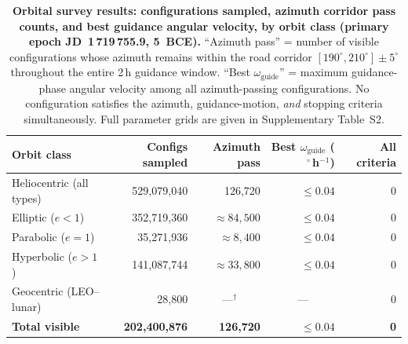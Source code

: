 \documentclass[sn-nature]{sn-jnl}
\begin{document}
\clearpage
\setcounter{table}{0}
\renewcommand{\thetable}{\textbf{Extended Data Table~\arabic{table}}}
\setcounter{figure}{0}
\renewcommand{\thefigure}{\textbf{Extended Data Fig.~\arabic{figure}}}

\begin{table}[h]
\caption{\textbf{Orbital survey results: configurations sampled, azimuth
  corridor pass counts, and best guidance angular velocity, by orbit class
  (primary epoch JD~1\,719\,755.9, 5~BCE).}
  ``Azimuth pass'' = number of visible configurations whose azimuth
  remains within the road corridor $[190^\circ,\!210^\circ]\pm5^\circ$
  throughout the entire 2\,h guidance window.
  ``Best $\omega_\text{guide}$'' = maximum guidance-phase angular velocity
  among all azimuth-passing configurations.
  No configuration satisfies the azimuth, guidance-motion, \emph{and}
  stopping criteria simultaneously.
  Full parameter grids are given in Supplementary Table~S2.}
\label{tab:survey}
\begin{tabular}{@{}lrrrr@{}}
\toprule
Orbit class & Configs sampled & Azimuth pass & Best $\omega_\text{guide}$
  ($^\circ$\,h$^{-1}$) & All criteria \\
\midrule
Heliocentric (all types) & 529,079,040 & 126,720 & $\leq 0.04$ & 0 \\
\quad Elliptic ($e<1$)   & 352,719,360 & $\approx\!84{,}500$ & $\leq 0.04$ & 0 \\
\quad Parabolic ($e=1$)  & 35,271,936  & $\approx\!8{,}400$  & $\leq 0.04$ & 0 \\
\quad Hyperbolic ($e>1$) & 141,087,744 & $\approx\!33{,}800$ & $\leq 0.04$ & 0 \\
Geocentric (LEO–lunar)   & 28,800      & \multicolumn{1}{c}{---$^\dagger$}
  & \multicolumn{1}{c}{---} & 0 \\
\midrule
\textbf{Total visible}   & \textbf{202,400,876} & \textbf{126,720} &
  $\leq\mathbf{0.04}$ & \textbf{0} \\
\bottomrule
\end{tabular}
\end{table}
\end{document}
